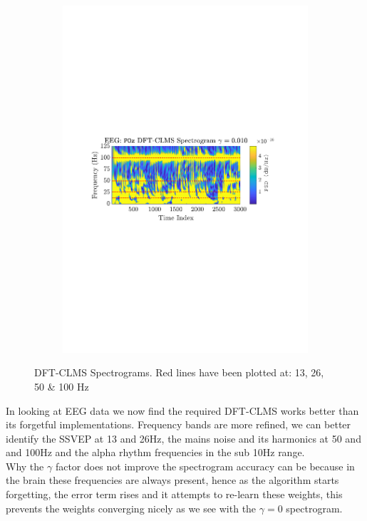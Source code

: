 \documentclass[12pt]{article}
\numberwithin{equation}{section}
\begin{document}
\begin{figure}[H]
\begin{subfigure}{0.49\textwidth}
					\includegraphics[trim={2.2cm 11.2cm 2.90cm  11.2cm}, clip, width=\textwidth]{../MATLAB/figures/q3_3d_fig04.pdf} 
					\captionsetup{justification=centering}
				\end{subfigure}
				
				\captionsetup{justification=centering}
				\caption{DFT-CLMS Spectrograms. Red lines have been plotted at: 13, 26, 50 \& 100 Hz }
				\label{fig: 3-3d}
			\end{figure}
			
			In looking at EEG data we now find the required DFT-CLMS works better than its forgetful implementations. Frequency bands are more refined, we can better identify the SSVEP at 13 and 26Hz, the mains noise and its harmonics at 50 and and 100Hz and the alpha rhythm frequencies in the sub 10Hz range.\\
			Why the $\gamma$ factor does not improve the spectrogram accuracy can be because in the brain these frequencies are always present, hence as the algorithm starts forgetting, the error term rises and it attempts to re-learn these weights, this prevents the weights converging nicely as we see with the $\gamma=0$ spectrogram.
	
\end{document}
